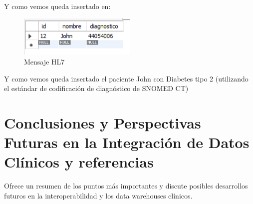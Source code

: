 \documentclass[12pt, a4paper, twoside]{article}
\begin{document}
	Y como vemos queda insertado en: 
	
	\begin{figure}[h!]
		\centering
		\includegraphics[width=0.5\textwidth]{image/10.png}
		\caption{Mensaje HL7}
		\label{fig:10}
	\end{figure}
	\vspace{2cm}
	
	Y como vemos queda insertado el paciente John con Diabetes tipo 2 (utilizando el estándar de codificación de diagnóstico de SNOMED CT)
	
	\section{Conclusiones y Perspectivas Futuras en la Integración de Datos Clínicos y referencias}
	Ofrece un resumen de los puntos más importantes y discute posibles desarrollos futuros en la interoperabilidad y los data warehouses clínicos.
	
	\printbibliography
	
	
	
	
\end{document}
